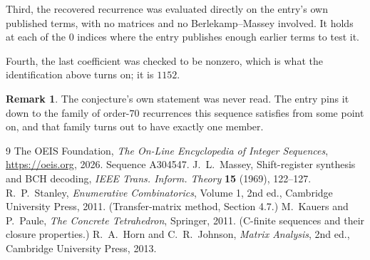 \documentclass[11pt,a4paper]{article}
\theoremstyle{plain}
\theoremstyle{definition}
\newtheorem{remark}[theorem]{Remark}
\begin{document}
Third, the recovered recurrence was evaluated directly on the entry's own published terms, with
no matrices and no Berlekamp--Massey involved. It holds at each of the $0$ indices where
the entry publishes enough earlier terms to test it.

Fourth, the last coefficient was checked to be nonzero, which is what the identification above
turns on; it is $1152$.

\begin{remark}
The conjecture's own statement was never read. The entry pins it down to the family of
order-$70$ recurrences this sequence satisfies from some point on, and that family turns
out to have exactly one member.
\end{remark}

\begin{thebibliography}{9}
 The OEIS Foundation, \emph{The On-Line Encyclopedia of Integer
Sequences}, \url{https://oeis.org}, 2026. Sequence A304547.
 J.~L.~Massey, Shift-register synthesis and BCH decoding, \emph{IEEE
Trans. Inform. Theory} \textbf{15} (1969), 122--127.
 R.~P.~Stanley, \emph{Enumerative Combinatorics}, Volume 1, 2nd ed.,
Cambridge University Press, 2011. (Transfer-matrix method, Section 4.7.)
 M.~Kauers and P.~Paule, \emph{The Concrete Tetrahedron}, Springer, 2011.
(C-finite sequences and their closure properties.)
 R.~A.~Horn and C.~R.~Johnson, \emph{Matrix Analysis}, 2nd ed., Cambridge
University Press, 2013.
\end{thebibliography}
\end{document}
